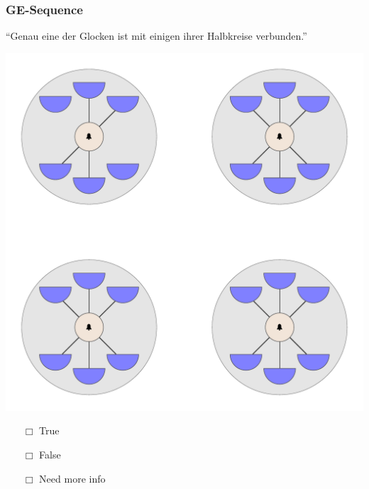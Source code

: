 \documentclass[fleqn,10pt,serif,xcolor=dvipsnames]{beamer}
\newcommand{\GE}{GE\xspace}
\newcommand{\mymark}[1]{{\color{blue}{#1}}}
\begin{document}
\begin{frame}
  \frametitle{\GE-Sequence}
  \begin{center}
    ``Genau eine der Glocken ist mit einigen ihrer Halbkreise verbunden.''

    \vspace{0.1cm}

    \includegraphics[width=0.5 \textwidth]{../../pictures/ge_01_5.pdf}

    \vspace{0.1cm}

    \begin{multicols}{3}
      \begin{itemize} 
      \item[$\Box$] True\\
        \onslide<2>{$\leadsto$  \mymark{local}}
      \item[$\Box$] False\\
        \onslide<2>{$\leadsto$ \mymark{false}}
      \item[$\Box$] Need more info 
      \end{itemize}
    \end{multicols}

  \end{center}
\end{frame}
\end{document}
